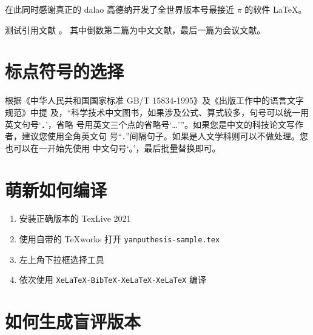 \documentclass[lang=chs, degree=phd, blindreview=false, winfonts=true]{ya-npu/yanputhesis}
\theoremstyle{plain}%
\theoremstyle{remark}%
\begin{document}
在此同时感谢真正的 dalao 高德纳开发了全世界版本号最接近 $\pi$ 的软件
\LaTeX \cite{knuth1986the}\nocite{lamport1989latex}。

测试引用文献 \cite{szegedy2015going, shen2021peridynamic, chen2014maiyuan, chen2018autonomous}。
其中倒数第二篇为中文文献，最后一篇为会议文献。

\section{标点符号的选择}

根据《中华人民共和国国家标准 GB/T 15834-1995》及《出版工作中的语言文字规范》中提
及，“科学技术中文图书，如果涉及公式、算式较多，句号可以统一用英文句号‘．’，省略
号用英文三个点的省略号‘…’”。如果您是中文的科技论文写作者，建议您使用全角英文句
号“\lstinline`．`”间隔句子。如果是人文学科则可以不做处理。您也可以在一开始先使用
中文句号‘。’，最后批量替换即可。

\section{萌新如何编译}

\begin{enumerate}
    \setlength{\itemsep}{0pt}
    \item 安装正确版本的 TexLive 2021
    \item 使用自带的 TeXworks 打开 \lstinline`yanputhesis-sample.tex`
    \item 左上角下拉框选择工具
    \item 依次使用 \lstinline`XeLaTeX-BibTeX-XeLaTeX-XeLaTeX` 编译
\end{enumerate}

\section{如何生成盲评版本}
\end{document}
